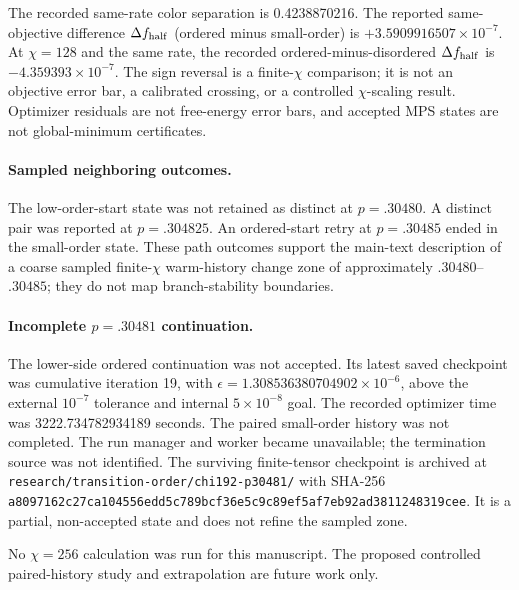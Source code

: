 \documentclass[aps,prx,onecolumn,nofootinbib]{revtex4-2}
\begin{document}
The recorded same-rate color separation is 0.4238870216. The reported same-objective difference $\Delta f_{\rm half}$ (ordered minus small-order) is $+3.5909916507\times10^{-7}$. At $\chi=128$ and the same rate, the recorded ordered-minus-disordered $\Delta f_{\rm half}$ is $-4.359393\times10^{-7}$. The sign reversal is a finite-$\chi$ comparison; it is not an objective error bar, a calibrated crossing, or a controlled $\chi$-scaling result. Optimizer residuals are not free-energy error bars, and accepted MPS states are not global-minimum certificates.

\paragraph{Sampled neighboring outcomes.} The low-order-start state was not retained as distinct at $p=.30480$. A distinct pair was reported at $p=.304825$. An ordered-start retry at $p=.30485$ ended in the small-order state. These path outcomes support the main-text description of a coarse sampled finite-$\chi$ warm-history change zone of approximately $.30480$--$.30485$; they do not map branch-stability boundaries.

\paragraph{Incomplete $p=.30481$ continuation.} The lower-side ordered continuation was not accepted. Its latest saved checkpoint was cumulative iteration 19, with $\epsilon=1.308536380704902\times10^{-6}$, above the external $10^{-7}$ tolerance and internal $5\times10^{-8}$ goal. The recorded optimizer time was 3222.734782934189 seconds. The paired small-order history was not completed. The run manager and worker became unavailable; the termination source was not identified. The surviving finite-tensor checkpoint is archived at \texttt{research/transition-order/chi192-p30481/} with SHA-256 \texttt{a8097162c27ca104556edd5c789bcf36e5c9c89ef5af7eb92ad3811248319cee}. It is a partial, non-accepted state and does not refine the sampled zone.

No $\chi=256$ calculation was run for this manuscript. The proposed controlled paired-history study and extrapolation are future work only.
\end{document}
